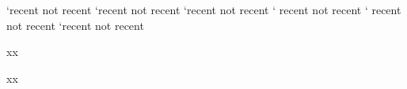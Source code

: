 \def\samepage#1#2{this page}
\def\recent#1#2{recent #2}
\def\notrecent#1#2{not recent #2}

`\lowercase{}\recent\samepage\notrecent'

`\lowercase{}\recent\samepage\notrecent'

`\lowercase{}\recent\samepage\notrecent'

` \recent\relax\notrecent'

` \recent\relax\notrecent'

`\recent\relax\notrecent'

\label{akarmi}

\newpage xx \newpage

\label{valami}

\newpage xx \newpage

\label{semmi}
